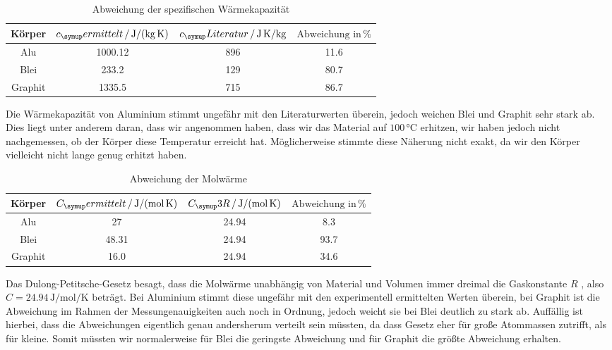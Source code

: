 \begin{table}
  \centering
  \begin{tabular}{c c c c}
    \toprule
    Körper & $c_\su{ermittelt}\,/\,\si{\joule\per\kilo\gram\per\kelvin}$ &
    $c_\su{Literatur}\,/\,\si{\joule\per\kilo\gram\kelvin}$\cite{bleialu} & $\text{Abweichung in}\,\%$ \\
    \midrule
    Alu & 1000.12 & 896 & 11.6 \\
    Blei & 233.2 & 129 & 80.7\\
    Graphit & 1335.5 & 715 & 86.7 \\
    \bottomrule
  \end{tabular}
  \caption{Abweichung der spezifischen Wärmekapazität}
\end{table}
Die Wärmekapazität von Aluminium\cite{bleilu} stimmt ungefähr mit den Literaturwerten überein,
jedoch weichen Blei \cite{bleialu} und Graphit \cite{graphit} sehr stark ab.
Dies liegt unter anderem daran,
dass wir angenommen haben, dass wir das Material auf $100\,\si{\celsius}$ erhitzen,
wir haben jedoch nicht nachgemessen, ob der Körper diese Temperatur erreicht hat.
Möglicherweise stimmte diese Näherung nicht exakt, da wir den Körper vielleicht
nicht lange genug erhitzt haben.

\begin{table}
  \centering
  \begin{tabular}{c c c c}
    \toprule
    Körper & $C_\su{ermittelt}\,/\,\si{\joule\per\mol\per\kelvin}$ &
    $C_\su{3R}\,/\,\si{\joule\per\mol\per\kelvin}$ & $\text{Abweichung in} \,\%$ \\
    \midrule
    Alu & 27 & 24.94 & 8.3 \\
    Blei & 48.31 & 24.94 & 93.7 \\
    Graphit & 16.0 & 24.94 & 34.6 \\
    \bottomrule
  \end{tabular}
  \caption{Abweichung der Molwärme}
\end{table}
Das Dulong-Petitsche-Gesetz besagt, dass die Molwärme unabhängig von Material und
Volumen immer dreimal die Gaskonstante $R$ \cite{chemie}, also
$ C = 24.94 \,\si{\joule\per\mol\per\kelvin}$
beträgt. Bei Aluminium stimmt diese ungefähr mit den experimentell
ermittelten Werten überein, bei Graphit ist die Abweichung im Rahmen der Messungenauigkeiten
auch noch in Ordnung, jedoch weicht sie bei Blei deutlich zu stark ab. Auffällig ist hierbei,
dass die Abweichungen eigentlich genau andersherum verteilt sein müssten, da dass Gesetz
eher für große Atommassen zutrifft, als für kleine. Somit müssten wir normalerweise für Blei
die geringste Abweichung und für Graphit die größte Abweichung erhalten.
